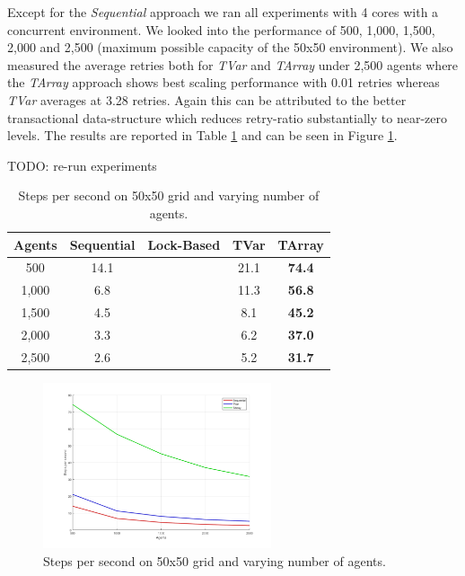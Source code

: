 Except for the \textit{Sequential} approach we ran all experiments with 4 cores with a concurrent environment. We looked into the performance of 500, 1,000, 1,500, 2,000 and 2,500 (maximum possible capacity of the 50x50 environment). We also measured the average retries both for \textit{TVar} and \textit{TArray} under 2,500 agents where the \textit{TArray} approach shows best scaling performance with 0.01 retries whereas \textit{TVar} averages at 3.28 retries. Again this can be attributed to the better transactional data-structure which reduces retry-ratio substantially to near-zero levels. The results are reported in Table \ref{tab:state_results_agentsscale_time} and can be seen in Figure \ref{fig:state_results_agentsscale_time}.

TODO: re-run experiments

\begin{table}
	\centering
  	\begin{tabular}{ c || c | c | c | c }
        Agents  & Sequential & Lock-Based & TVar       & TArray        \\ \hline \hline 
    	500     & 14.1       & 			  &	21.1       & \textbf{74.4} \\ \hline
   		1,000   & 6.8        & 			  & 11.3       & \textbf{56.8} \\ \hline
   		1,500   & 4.5        & 			  & 8.1        & \textbf{45.2} \\ \hline
   		2,000   & 3.3        & 			  & 6.2        & \textbf{37.0} \\ \hline 
   		2,500   & 2.6        & 			  & 5.2        & \textbf{31.7}
   	\end{tabular}
  	
  	\caption{Steps per second on 50x50 grid and varying number of agents.}
	\label{tab:state_results_agentsscale_time}
\end{table}

\begin{figure}
	\centering
	\includegraphics[width=0.6\textwidth, angle=0]{./fig/sugarscape/agents_performance.png}
	\caption{Steps per second on 50x50 grid and varying number of agents.}
	\label{fig:state_results_agentsscale_time}
\end{figure}

